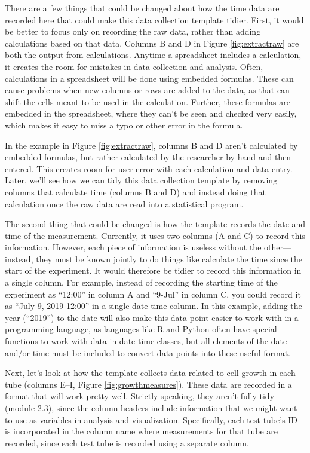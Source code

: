 \documentclass[]{tufte-book}
\begin{document}
There are a few things that could be changed about how the time data are
recorded here that could make this data collection template tidier. First, it
would be better to focus only on recording the raw data, rather than adding
calculations based on that data. Columns B and D in Figure \ref{fig:extractraw}
are both the output from calculations. Anytime a spreadsheet includes a
calculation, it creates the room for mistakes in data collection and analysis.
Often, calculations in a spreadsheet will be done using embedded formulas. These
can cause problems when new columns or rows are added to the data, as that
can shift the cells meant to be used in the calculation. Further, these formulas
are embedded in the spreadsheet, where they can't be seen and checked very
easily, which makes it easy to miss a typo or other error in the formula.

In the example in Figure \ref{fig:extractraw}, columns B and D aren't
calculated by embedded formulas, but rather calculated by the researcher by hand
and then entered. This creates room for user error with each calculation
and data entry. Later, we'll see how we can tidy this data collection
template by removing columns that calculate time (columns B and D) and instead
doing that calculation once the raw data are read into a statistical program.

The second thing that could be changed is how the template records the date and
time of the measurement. Currently, it uses two columns (A and C) to record this
information. However, each piece of information is useless without the
other---instead, they must be known jointly to do things like calculate the time
since the start of the experiment. It would therefore be tidier to record this
information in a single column. For example, instead of recording the starting
time of the experiment as ``12:00'' in column A and ``9-Jul'' in column C, you could
record it as ``July 9, 2019 12:00'' in a single date-time column. In this example,
adding the year (``2019'') to the date will also make this data point easier to
work with in a programming language, as languages like R and Python often have
special functions to work with data in date-time classes, but all elements of
the date and/or time must be included to convert data points into these useful
format.

Next, let's look at how the template collects data related to cell growth in
each tube (columns E--I, Figure \ref{fig:growthmeasures}). These data are
recorded in a format that will work pretty well. Strictly speaking, they aren't
fully tidy (module 2.3), since the column headers include information that we
might want to use as variables in analysis and visualization. Specifically, each
test tube's ID is incorporated in the column name where measurements for that
tube are recorded, since each test tube is recorded using a separate column.
\end{document}
